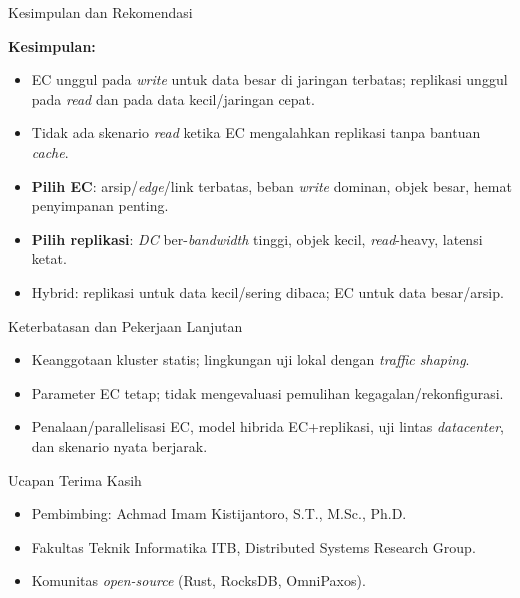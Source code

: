 \documentclass[a2,portrait]{config/poster/a0poster}
\newcommand{\postersection}[1]{%
	\begin{tcolorbox}[
		colback=MainBlue,
		colframe=MainBlue,
		fonttitle=\bfseries,
		coltext=white,
		sharp corners,
		boxrule=0pt,
		top=0pt,
		bottom=0pt,
		halign=center
	]
	\normalsize #1
	\end{tcolorbox}%
}
\begin{document}
\begin{multicols}{2}
\postersection{Kesimpulan dan Rekomendasi}
			\textbf{Kesimpulan:}
\begin{itemize}
	\item EC unggul pada \textit{write} untuk data besar di jaringan terbatas; replikasi unggul pada \textit{read} dan pada data kecil/jaringan cepat.
	\item Tidak ada skenario \textit{read} ketika EC mengalahkan replikasi tanpa bantuan \textit{cache}.
\end{itemize}
\begin{itemize}
	\item \textbf{Pilih EC}: arsip/\textit{edge}/link terbatas, beban \textit{write} dominan, objek besar, hemat penyimpanan penting.
	\item \textbf{Pilih replikasi}: \textit{DC} ber-\textit{bandwidth} tinggi, objek kecil, \textit{read}-heavy, latensi ketat.
	\item Hybrid: replikasi untuk data kecil/sering dibaca; EC untuk data besar/arsip.
\end{itemize}


\postersection{Keterbatasan dan Pekerjaan Lanjutan}
\begin{itemize}
	\item Keanggotaan kluster statis; lingkungan uji lokal dengan \textit{traffic shaping}.
	\item Parameter EC tetap; tidak mengevaluasi pemulihan kegagalan/rekonfigurasi.
\end{itemize}
\begin{itemize}
	\item Penalaan/parallelisasi EC, model hibrida EC+replikasi, uji lintas \textit{datacenter}, dan skenario nyata berjarak.
\end{itemize}


\postersection{Ucapan Terima Kasih}
\begin{itemize}
	\item Pembimbing: Achmad Imam Kistijantoro, S.T., M.Sc., Ph.D.
	\item Fakultas Teknik Informatika ITB, Distributed Systems Research Group.
	\item Komunitas \textit{open-source} (Rust, RocksDB, OmniPaxos).
\end{itemize}


\end{multicols}
\end{document}
